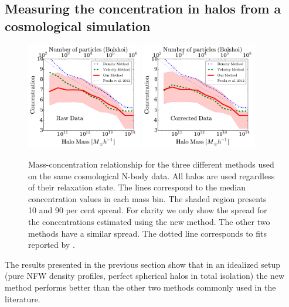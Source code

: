 \documentclass[a4,useAMS,usenatbib,usegraphicx]{mn2e}
\begin{document}
\subsection{Measuring the concentration in halos from a cosmological simulation}


\begin{figure}
\begin{center}
  \includegraphics[width=0.45\textwidth]{concentration_bolshoi.pdf}
  \includegraphics[width=0.45\textwidth]{concentration_bolshoi_corrected.pdf}
\end{center}
\vspace{-0.5cm}
\caption{Mass-concentration relationship for the three different
  methods used on the same cosmological N-body data. 
  All halos are used regardless of their relaxation state.
  The lines correspond to the median concentration values in each mass bin.
  The shaded region presents 10 and 90 per cent spread.
  For clarity we only show the spread for the concentrations estimated
  using the new method. The other two methods have a similar spread. The
  dotted line corresponds to fits reported by \citep{Prada2012}.
  \label{fig:concentration}}
\end{figure}


The results presented in the previous section show that in an
idealized setup (pure NFW density profiles, perfect spherical halos in
total isolation) the new method performs better than the other two
methods commonly used in the literature.
\end{document}
